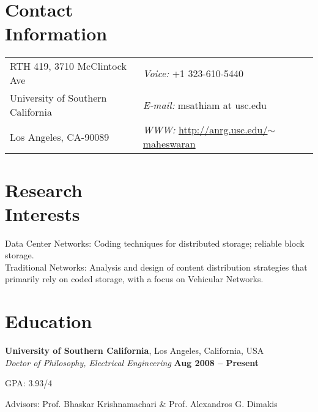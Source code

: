 \documentclass[margin,line]{resume}
\begin{document}
\begin{resume}


\section{\mysidestyle Contact\\Information}


\begin{tabular}{@{}p{3in}p{6in}}
RTH 419, 3710 McClintock Ave & {\it Voice:}  +1 323-610-5440 \\            
University of Southern California & {\it E-mail:}  msathiam at usc.edu\\
Los Angeles, CA-90089 & {\it WWW:} \href{http://anrg.usc.edu/~maheswaran}{http://anrg.usc.edu/$\sim$maheswaran} \\     
\end{tabular}

    \section{\mysidestyle Research\\Interests}
	Data Center Networks: Coding techniques for distributed storage; reliable block storage. \\
	Traditional Networks: Analysis and design of content distribution strategies that primarily rely on coded storage, with a focus on Vehicular Networks.

    \section{\mysidestyle Education}

    \textbf{University of Southern California}, Los Angeles, California, USA \\%
    \textsl{Doctor of Philosophy, Electrical Engineering} \hfill \textbf{ Aug 2008 -- Present}\vspace{-3mm}\\\vspace{-1mm}
    \begin{list2}
        \item GPA: 3.93/4
        \item Advisors:  Prof. Bhaskar Krishnamachari \& Prof. Alexandros G. Dimakis
    \end{list2}\vspace{-1.5mm}
    

\end{resume}
\end{document}
